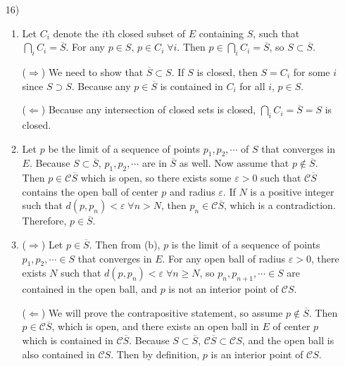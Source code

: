 \documentclass[a4paper,12pt]{article}
\begin{document}
\begin{enumerate}
        \item[16)]
            \begin{enumerate}
                \item
                    Let $C_i$ denote the $i$th closed subset of $E$ containing $S$, such that $\bigcap_i C_i = \overline{S}$. For any $p \in S$, $p \in C_i \; \forall i$. Then $p \in \bigcap_i C_i = \overline{S}$, so $S \subset \overline{S}$. \par
                    ($\Rightarrow$) We need to show that $\overline{S} \subset S$. If $S$ is closed, then $S = C_i$ for some $i$ since $S \supset S$. Because any $p \in \overline{S}$ is contained in $C_i$ for all $i$, $p \in S$. \par
                    ($\Leftarrow$) Because any intersection of closed sets is closed, $\bigcap_i C_i = \overline{S} = S$ is closed.

                \item
                    Let $p$ be the limit of a sequence of points $p_1, p_2, \cdots$ of $S$ that converges in $E$. Because $S \subset \overline{S}$, $p_1, p_2, \cdots$ are in $\overline{S}$ as well. Now assume that $p \notin \overline{S}$. Then $p \in \mathcal{C} \overline{S}$ which is open, so there exists some $\varepsilon > 0$ such that $\mathcal{C} \overline{S}$ contains the open ball of center $p$ and radius $\varepsilon$. If $N$ is a positive integer such that $d(p, p_n) < \varepsilon \; \forall n > N$, then $p_n \in \mathcal{C} \overline{S}$, which is a contradiction. Therefore, $p \in \overline{S}$.

                \item
                    ($\Rightarrow$) Let $p \in \overline{S}$. Then from (b), $p$ is the limit of a sequence of points $p_1, p_2, \cdots \in S$ that converges in $E$. For any open ball of radius $\varepsilon > 0$, there exists $N$ such that $d(p, p_n) < \varepsilon \; \forall n \geq N$, so $p_n, p_{n + 1}, \cdots \in S$ are contained in the open ball, and $p$ is not an interior point of $\mathcal{C} S$. \par
                    ($\Leftarrow$) We will prove the contrapositive statement, so assume $p \notin \overline{S}$. Then $p \in \mathcal{C} \overline{S}$, which is open, and there exists an open ball in $E$ of center $p$ which is contained in $\mathcal{C} \overline{S}$. Because $S \subset \overline{S}$, $\mathcal{C} \overline{S} \subset \mathcal{C} S$, and the open ball is also contained in $\mathcal{C} S$. Then by definition, $p$ is an interior point of $\mathcal{C} S$.
            \end{enumerate}


\end{enumerate}
\end{document}
